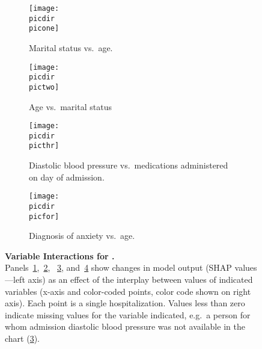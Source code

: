 \begin{figure}
    \begin{adjustbox}{minipage=7.0in,frame}
    \vspace{2.5mm}
    \centering
    \def\target{gender}
    \def\picdir{supplementary/\target/}
    \def\labbig{fig:genderint}
    \def\picone{\target_SHAP_dependence_1.pdf}
    \def\pictwo{\target_SHAP_dependence_6.pdf}
    \def\picthr{\target_SHAP_dependence_7.pdf}
    \def\picfor{\target_SHAP_dependence_9.pdf}
    \def\capone{Marital status vs.\ age.}
    \def\labone{fig:genderintmarriedage}
    \def\captwo{Age vs.\ marital status}
    \def\labtwo{fig:genderintagemarried}
    \def\capthr{Diastolic blood pressure vs.\ medications administered on day of admission.}
    \def\labthr{fig:genderintdbpmeds}
    \def\capfor{Diagnosis of anxiety vs.\ age.}
    \def\labfor{fig:genderintanxietyage}
    \def\capbig{\textbf{Variable Interactions for \titlecap{\target}.} \\ %
    Panels~\ref{\labone},~\ref{\labtwo},%
    ~\ref{\labthr}, and~\ref{\labfor} %
    show changes in model output (SHAP values---left axis) %
    as an effect of the interplay between %
    values of indicated variables (x-axis and color-coded points, %
    color code shown on right axis).\@
    Each point is a single hospitalization.\@
    Values less than zero indicate missing values for the variable indicated, %
    e.g.\ a person for whom admission diastolic blood pressure was not available in the chart (\ref{\labthr}).\@
    }
    \begin{subfigure}[t]{.45\linewidth}
        \centering
        \captionsetup[subfigure]{}
        \caption{\capone{}}\label{\labone}
        \texttt{[image: \\picdir\\picone]}
    \end{subfigure}%
    \hspace{5mm}%
    \begin{subfigure}[t]{.45\linewidth}
        \centering
        \captionsetup[subfigure]{}
        \caption{\captwo}\label{\labtwo}
        \texttt{[image: \\picdir\\pictwo]}
    \end{subfigure}%
    
    \vspace{5mm}
    \begin{subfigure}[t]{.45\linewidth}
        \centering
        \captionsetup[subfigure]{}
        \caption{\capthr}\label{\labthr}
        \texttt{[image: \\picdir\\picthr]}
    \end{subfigure}%
    \hspace{5mm}%
    \begin{subfigure}[t]{.45\linewidth}
        \centering
        \captionsetup[subfigure]{}
        \caption{\capfor}\label{\labfor}
        \texttt{[image: \\picdir\\picfor]}
    \end{subfigure}%
    
    \caption{\capbig}\label{\labbig}
    \end{adjustbox}
    \end{figure}